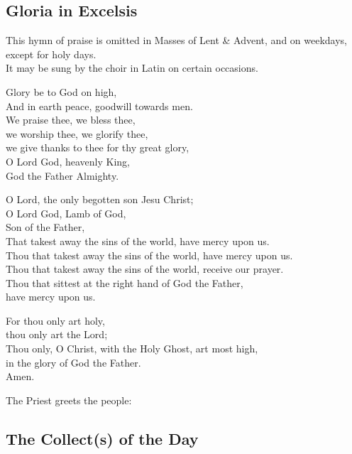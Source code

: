 \newpage

\subsection{Gloria in Excelsis}

\begin{rubric}
This hymn of praise is omitted in Masses of Lent \& Advent, and on weekdays, except for holy days.\\
It may be sung by the choir in Latin on certain occasions.
\end{rubric}

Glory be to God on high,\\
And in earth peace, goodwill towards men.\\
We praise thee, we bless thee,\\
we worship thee, we glorify thee,\\
we give thanks to thee for thy great glory,\\
O Lord God, heavenly King,\\
God the Father Almighty.

O Lord, the only begotten son Jesu Christ;\\
O Lord God, Lamb of God,\\
Son of the Father,\\
That takest away the sins of the world, have mercy upon us.\\
Thou that takest away the sins of the world, have mercy upon us.\\
Thou that takest away the sins of the world, receive our prayer.\\
Thou that sittest at the right hand of God the Father,\\
have mercy upon us.

For thou only art holy,\\
thou only art the Lord;\\
Thou only, O Christ, with the Holy Ghost, art most high,\\
\cross in the glory of God the Father.\\
Amen.

\begin{rubric}
The Priest greets the people:
\end{rubric}


\subsection{The Collect(s) of the Day}

